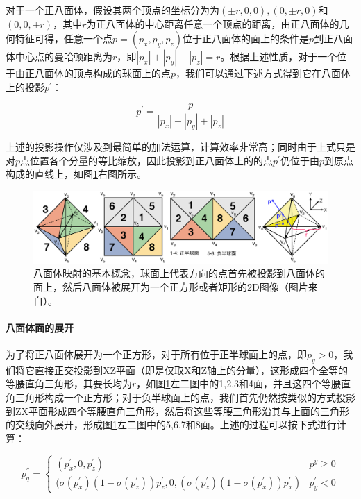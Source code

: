 对于一个正八面体，假设其两个顶点的坐标分为为$(\pm r,0,0),(0,\pm r,0)$和$(0,0,\pm r)$，其中$r$为正八面体的中心距离任意一个顶点的距离，由正八面体的几何特征可得，任意一个点$p=(p_x,p_y,p_z)$位于正八面体的面上的条件是$p$到正八面体中心点的曼哈顿距离为$r$，即$|p_x|+|p_y|+|p_z|=r$。根据上述性质，对于一个位于由正八面体的顶点构成的球面上的点$p$，我们可以通过下述方式得到它在八面体上的投影$p^{'}$：

\begin{equation}\label{e:pl-octahedron-projection}
	p^{'}=\frac{p}{|p_x|+|p_y|+|p_z|}
\end{equation}

上述的投影操作仅涉及到最简单的加法运算，计算效率非常高；同时由于上式只是对$p$点位置各个分量的等比缩放，因此投影到正八面体上的的点$p^{'}$仍位于由$p$到原点构成的直线上，如图\ref{f:pl-octahedron-mapping}右图所示。

\begin{figure}
\begin{fullwidth}
	\includegraphics[width=\thewidth]{figures/pl/octahedron-mapping}
	\caption{八面体映射的基本概念，球面上代表方向的点首先被投影到八面体的面上，然后八面体被展开为一个正方形或者矩形的2D图像（图片来自\cite{a:OctahedronEnvironmentMaps}）。}
	\label{f:pl-octahedron-mapping}
\end{fullwidth}
\end{figure}



\paragraph{八面体面的展开}
为了将正八面体展开为一个正方形，对于所有位于正半球面上的点，即$p_y>0$，我们将它直接正交投影到XZ平面（即是仅取X和Z轴上的分量），这形成四个全等的等腰直角三角形，其要长均为$r$，如图\ref{f:pl-octahedron-mapping}左二图中的1,2,3和4面，并且这四个等腰直角三角形构成一个正方形；对于负半球面上的点，我们首先仍然按类似的方式投影到ZX平面形成四个等腰直角三角形，然后将这些等腰三角形沿其与上面的三角形的交线向外展开，形成图\ref{f:pl-octahedron-mapping}左二图中的5,6,7和8面。上述的过程可以按下式进行计算：

\begin{equation}
	p^{''}_q=\begin{cases}
		(p^{'}_x,0,p^{'}_z)  & p^{y}\geq 0\\
		(\sigma(p^{'}_x)(1-\sigma(p^{'}_z))p^{'}_z,0,(\sigma(p^{'}_z)(1-\sigma(p^{'}_x))p^{'}_x) & p^{'}_y<0
	\end{cases}
\end{equation}

